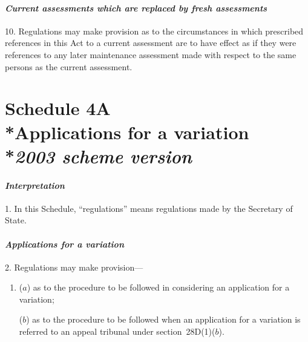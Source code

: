 \documentclass[12pt,a4paper]{article}
\begin{document}

\subsection*{\itshape Current assessments which are replaced by fresh assessments}

10. Regulations may make provision as to the circumstances in which prescribed references in this Act to a current assessment are to have effect as if they were references to any later maintenance assessment made with respect to the same persons as the current assessment.

\part[Schedule 4A --- Applications for a variation --- \emph{2003 scheme version}]{\noindent S\lowercase{CHEDULE} 4A\\*Applications for a variation\\*\emph{2003 scheme version}}


\subsection*{\itshape Interpretation}

1. In this Schedule, “regulations” means regulations made by the Secretary of State.

\subsection*{\itshape Applications for a variation}

2. Regulations may make provision—
\begin{enumerate}\item[]
($a$) as to the procedure to be followed in considering an application for a variation;

($b$) as to the procedure to be followed when an application for a variation is referred to an appeal tribunal under section~28D(1)($b$).
\end{enumerate}
\end{document}
